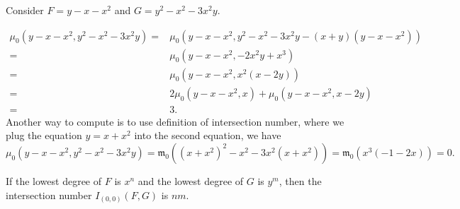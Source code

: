 \documentclass[10pt]{article}
\begin{document}
\begin{example}
  Consider $ F = y - x - x^{2}$ and $ G = y^{2} - x^{2} - 3 x^{2}y$.
\end{example}
\begin{solution}
  \begin{equation*}
    \begin{aligned}
      \mu_{0}(y-x- x^{2} , y^{2} - x^{2} - 3 x^{2}y) = & \mu_{0}(y - x - x^{2} , y^{2} - x^{2} - 3 x^{2}y - (x+y)(y - x - x^{2})) \\
      = & \mu_{0}(y - x - x^{2} , - 2 x^{2}y + x^{3}) \\
      = & \mu_{0}(y - x - x^{2}, x^{2} (x - 2y)) \\
      = & 2 \mu_{0}(y - x - x^{2}, x) + \mu_{0}(y - x - x^{2}, x - 2y) \\
      = & 3.
    \end{aligned}
  \end{equation*}
  Another way to compute is to use definition of intersection number, where we plug the equation $ y = x+x^{2}$ into the second equation, we have
  \begin{equation*}
    \mu_{0}(y - x - x^{2} , y^{2} - x^{2} - 3 x^{2}y) = \mathfrak{m}_0\left( (x+x^{2})^{2} - x^{2} - 3 x^{2}(x+x^{2}) \right) = \mathfrak{m}_0 \left( x^{3}(-1-2x) \right) = 0.
  \end{equation*}
\end{solution}

\begin{proposition}
  If the lowest degree of $ F$ is $ x^{n}$ and the lowest degree of $ G$ is $ y^{m}$, then the intersection number $ I_{(0,0)}(F,G)$ is $ nm$.
\end{proposition}
\end{document}
